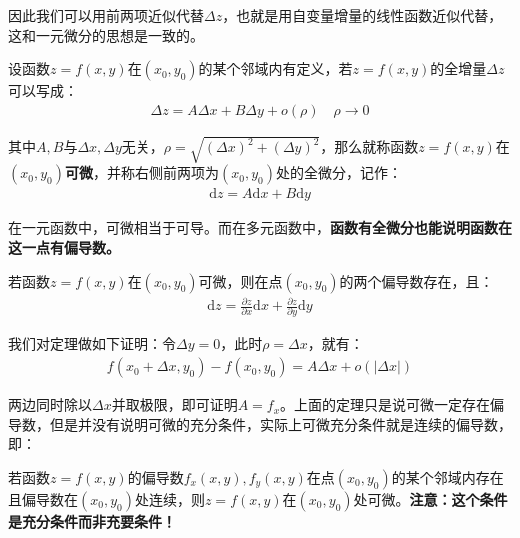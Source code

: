 \documentclass{ctexart}
\let\oldtextbf\textbf %
\renewcommand{\textbf}[1]{\textcolor{btex}{\oldtextbf{#1}}} %
\begin{document}
因此我们可以用前两项近似代替$\Delta z$，也就是用自变量增量的线性函数近似代替，这和一元微分的思想是一致的。
\begin{tcolorbox}[
    colback=bac2,     %
    colframe=fra2,   %
    coltitle=white,             %
    coltext=tex2,
    title=全微分的定义,
    fonttitle=\bfseries,        %
arc=3mm,                     %
breakable
]
设函数$z=f(x,y)$在$(x_0,y_0)$的某个邻域内有定义，若$z=f(x,y)$的全增量$\Delta z$可以写成：
\begin{align*}
    \Delta z=A\Delta x+B\Delta y+o(\rho)\quad \rho\to 0\tag{7-5}
\end{align*}

其中$A,B$与$\Delta x,\Delta y$无关，$\rho=\sqrt{(\Delta x)^2+(\Delta y)^2}$，那么就称函数$z=f(x,y)$在$(x_0,y_0)$\textbf{可微}，并称右侧前两项为$(x_0,y_0)$处的全微分，记作：
\begin{align*}
    \mathrm{d}z=A\mathrm{d}x+B\mathrm{d}y
\end{align*}
\end{tcolorbox}

在一元函数中，可微相当于可导。而在多元函数中，\textbf{函数有全微分也能说明函数在这一点有偏导数。}
\begin{tcolorbox}[
    colback=bac1,     %
    colframe=fra1,   %
    coltitle=white,             %
    coltext=tex1,
    title=函数全微分与偏导数的关系,
    fonttitle=\bfseries,        %
arc=3mm,                     %
breakable
]
若函数$z=f(x,y)$在$(x_0,y_0)$可微，则在点$(x_0,y_0)$的两个偏导数存在，且：
\begin{align*}
    \mathrm{d}z=\frac{\partial z}{\partial x}\mathrm{d}x+\frac{\partial z}{\partial y}\mathrm{d}y\tag{7-6}
\end{align*}
\end{tcolorbox}

我们对定理做如下证明：令$\Delta y=0$，此时$\rho=\Delta x$，就有：
\begin{align*}
    f(x_0+\Delta x,y_0)-f(x_0,y_0)=A\Delta x+o(|\Delta x|)
\end{align*}

两边同时除以$\Delta x$并取极限，即可证明$A=f_x$。上面的定理只是说可微一定存在偏导数，但是并没有说明可微的充分条件，实际上可微充分条件就是连续的偏导数，即：
\begin{tcolorbox}[
    colback=bac1,     %
    colframe=fra1,   %
    coltitle=white,             %
    coltext=tex1,
    title=可微的充分条件,
    fonttitle=\bfseries,        %
arc=3mm,                     %
breakable
]
若函数$z=f(x,y)$的偏导数$f_x(x,y),f_y(x,y)$在点$(x_0,y_0)$的某个邻域内存在且偏导数在$(x_0,y_0)$处连续，则$z=f(x,y)$在$(x_0,y_0)$处可微。\textbf{注意：这个条件是充分条件而非充要条件！}
\end{tcolorbox}
\end{document}
